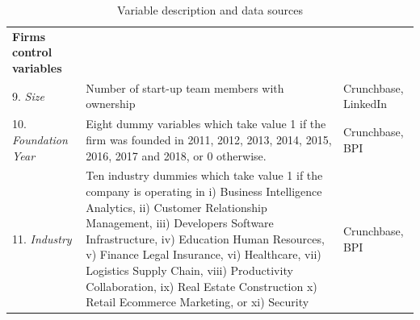 \documentclass[12pt]{article}
\begin{document}
\begin{table} [ht]
\begin{tabularx}{\textwidth}{ p{5cm} p{7cm} p{2.2cm} }
\textbf{Firms control variables}& &\\
9. \textit{Size} & Number of start-up team members with ownership & Crunchbase, LinkedIn\\
10. \textit{Foundation Year} & Eight dummy variables which take value 1 if the firm was founded in 2011, 2012, 2013, 2014, 2015, 2016, 2017 and 2018, or 0 otherwise. & Crunchbase, BPI\\
11. \textit{Industry} & Ten industry dummies which take value 1 if the company is operating in i) Business Intelligence Analytics, ii) Customer Relationship Management, iii) Developers Software Infrastructure, iv) Education Human Resources, v) Finance Legal Insurance, vi) Healthcare, vii) Logistics Supply Chain, viii) Productivity Collaboration, ix) Real Estate Construction x) Retail Ecommerce Marketing, or xi) Security & Crunchbase, BPI \\
\cmidrule(r){1-3}
\end{tabularx}
\caption{Variable description and data sources}
\label{table1}
\end{table}

\end{document}
